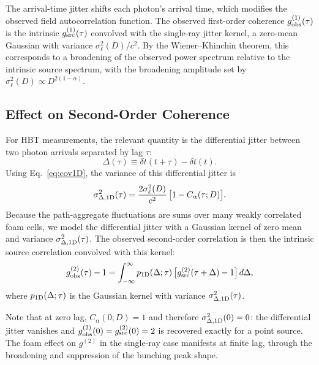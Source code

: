 \documentclass[aps,prd,onecolumn,amsmath,amssymb]{revtex4-2}
\begin{document}
The arrival-time jitter shifts each photon's arrival time, which modifies the
observed field autocorrelation function.
The observed first-order coherence $g^{(1)}_{\rm obs}(\tau)$ is the intrinsic
$g^{(1)}_{\rm src}(\tau)$ convolved with the single-ray jitter kernel,
a zero-mean Gaussian with variance $\sigma_\ell^2(D)/c^2$.
By the Wiener--Khinchin theorem, this corresponds to a broadening of the
observed power spectrum relative to the intrinsic source spectrum, with the
broadening amplitude set by $\sigma_\ell^2(D) \propto D^{2(1-\alpha)}$.

\subsection{Effect on Second-Order Coherence}

For HBT measurements, the relevant quantity is the differential jitter between
two photon arrivals separated by lag $\tau$:
\begin{equation}
  \Delta(\tau) \equiv \delta t(t+\tau) - \delta t(t).
  \label{eq:diffJitter1D}
\end{equation}
Using Eq.~\eqref{eq:cov1D}, the variance of this differential jitter is
\begin{equation}
  \sigma_{\Delta,{\rm 1D}}^2(\tau)
  = \frac{2\sigma_\ell^2(D)}{c^2}\,\big[1 - C_\alpha(\tau;D)\big].
  \label{eq:diffVar1D}
\end{equation}
Because the path-aggregate fluctuations are sums over many weakly correlated
foam cells, we model the differential jitter with a Gaussian kernel of zero
mean and variance $\sigma_{\Delta,{\rm 1D}}^2(\tau)$.
The observed second-order correlation is then the intrinsic source correlation
convolved with this kernel:
\begin{equation}
  g^{(2)}_{\rm obs}(\tau) - 1
  = \int_{-\infty}^{\infty}
      p_{\rm 1D}(\Delta;\tau)\,\big[g^{(2)}_{\rm src}(\tau+\Delta)-1\big]\,d\Delta,
  \label{eq:g2obs1D}
\end{equation}
where $p_{\rm 1D}(\Delta;\tau)$ is the Gaussian kernel with variance
$\sigma_{\Delta,{\rm 1D}}^2(\tau)$.

Note that at zero lag, $C_\alpha(0;D)=1$ and therefore
$\sigma_{\Delta,{\rm 1D}}^2(0) = 0$: the differential jitter vanishes and
$g^{(2)}_{\rm obs}(0) = g^{(2)}_{\rm src}(0) = 2$ is recovered exactly for
a point source.
The foam effect on $g^{(2)}$ in the single-ray case manifests at finite lag,
through the broadening and suppression of the bunching peak shape.
\end{document}
